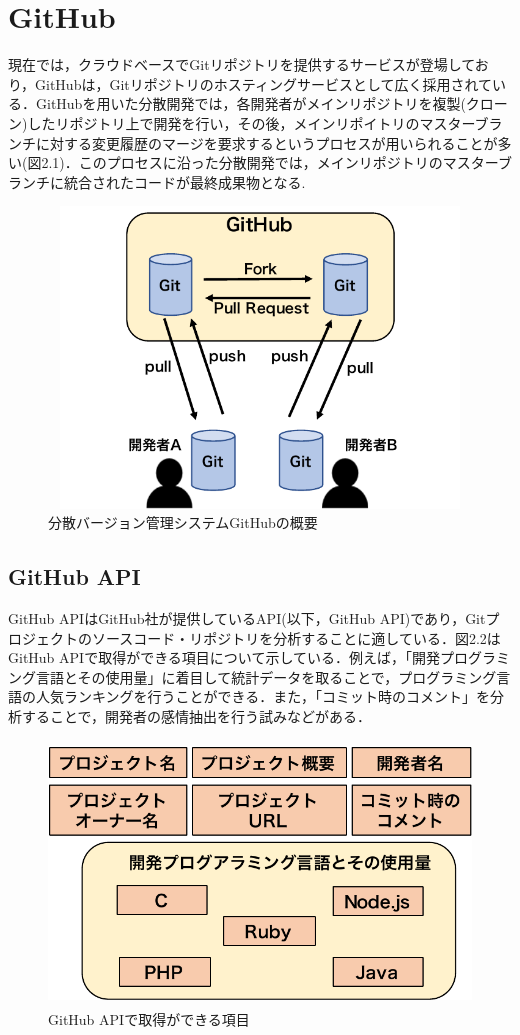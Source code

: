 \documentclass{funthesis}
\begin{document}
\section{GitHub}

現在では，クラウドベースでGitリポジトリを提供するサービスが登場しており，GitHubは，Gitリポジトリのホスティングサービスとして広く採用されている．GitHubを用いた分散開発では，各開発者がメインリポジトリを複製(クローン)したリポジトリ上で開発を行い，その後，メインリポイトリのマスターブランチに対する変更履歴のマージを要求するというプロセスが用いられることが多い(図2.1)．このプロセスに沿った分散開発では，メインリポジトリのマスターブランチに統合されたコードが最終成果物となる\cite{Matsubara}.
\begin{figure}[!t]
\centering  %
\includegraphics[clip,width = 14cm,height=8cm]{figures/github.pdf}
\caption{分散バージョン管理システムGitHubの概要}    \label{sample}
\end{figure}
\subsection{GitHub API}
GitHub APIはGitHub社が提供しているAPI(以下，GitHub API)であり，Gitプロジェクトのソースコード・リポジトリを分析することに適している．図2.2はGitHub APIで取得ができる項目について示している．例えば，「開発プログラミング言語とその使用量」に着目して統計データを取ることで，プログラミング言語の人気ランキングを行うことができる．また，「コミット時のコメント」を分析することで，開発者の感情抽出を行う試みなどがある．

\begin{figure}[!t]
\centering  %
\includegraphics[clip,width=12cm,height=7cm]{figures/github_api.pdf}
  \caption{GitHub APIで取得ができる項目}    \label{sample}
\end{figure}
\end{document}
